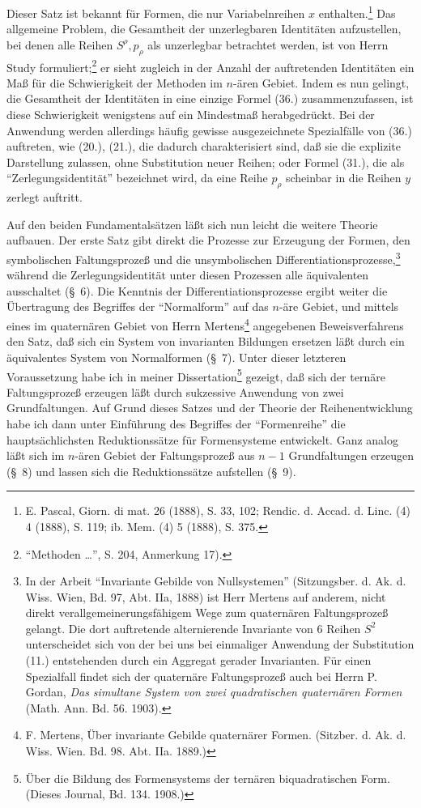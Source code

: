 \documentclass[11pt]{article}
\begin{document}
Dieser Satz ist bekannt für Formen, die nur Variabelnreihen $x$ enthalten.\footnote{E. Pascal, Giorn. di mat. 26 (1888), S. 33, 102; Rendic. d. Accad. d. Linc. (4) 4 (1888), S. 119; ib. Mem. (4) 5 (1888), S. 375.} Das allgemeine Problem, die Gesamtheit der unzerlegbaren Identitäten aufzustellen, bei denen alle Reihen $S^\rho,p_\rho$ als unzerlegbar betrachtet werden, ist von Herrn Study formuliert;\footnote{``Methoden \dots'', S. 204, Anmerkung 17).} er sieht zugleich in der Anzahl der auftretenden Identitäten ein Maß für die Schwierigkeit der Methoden im $n$-ären Gebiet. Indem es nun gelingt, die Gesamtheit der Identitäten in eine einzige Formel (36.) zusammenzufassen, ist diese Schwierigkeit wenigstens auf ein Mindestmaß herabgedrückt. Bei der Anwendung werden allerdings häufig gewisse ausgezeichnete Spezialfälle von (36.) auftreten, wie (20.), (21.), die dadurch charakterisiert sind, daß sie die explizite Darstellung zulassen, ohne Substitution neuer Reihen; oder Formel (31.), die als ``Zerlegungsidentität'' bezeichnet wird, da eine Reihe $p_\rho$ scheinbar in die Reihen $y$ zerlegt auftritt.

Auf den beiden Fundamentalsätzen läßt sich nun leicht die weitere Theorie aufbauen. Der erste Satz gibt direkt die Prozesse zur Erzeugung der Formen, den symbolischen Faltungsprozeß und die unsymbolischen Differentiationsprozesse,\footnote{In der Arbeit ``Invariante Gebilde von Nullsystemen'' (Sitzungsber. d. Ak. d. Wiss. Wien, Bd. 97, Abt. IIa, 1888) ist Herr Mertens auf anderem, nicht direkt verallgemeinerungsfähigem Wege zum quaternären Faltungsprozeß gelangt. Die dort auftretende alternierende Invariante von 6 Reihen $S^2$ unterscheidet sich von der bei uns bei einmaliger Anwendung der Substitution (11.) entstehenden durch ein Aggregat gerader Invarianten. Für einen Spezialfall findet sich der quaternäre Faltungsprozeß auch bei Herrn P. Gordan, \emph{Das simultane System von zwei quadratischen quaternären Formen} (Math. Ann. Bd. 56. 1903).} während die Zerlegungsidentität unter diesen Prozessen alle äquivalenten ausschaltet (\S\ 6). Die Kenntnis der Differentiationsprozesse ergibt weiter die Übertragung des Begriffes der ``Normalform'' auf das $n$-äre Gebiet, und mittels eines im quaternären Gebiet von Herrn Mertens\footnote{F. Mertens, Über invariante Gebilde quaternärer Formen. (Sitzber. d. Ak. d. Wiss. Wien. Bd. 98. Abt. IIa. 1889.)} angegebenen Beweisverfahrens den Satz, daß sich ein System von invarianten Bildungen ersetzen läßt durch ein äquivalentes System von Normalformen (\S\ 7). Unter dieser letzteren Voraussetzung habe ich in meiner Dissertation\footnote{Über die Bildung des Formensystems der ternären biquadratischen Form. (Dieses Journal, Bd. 134. 1908.)} gezeigt, daß sich der ternäre Faltungsprozeß erzeugen läßt durch sukzessive Anwendung von zwei Grundfaltungen. Auf Grund dieses Satzes und der Theorie der Reihenentwicklung habe ich dann unter Einführung des Begriffes der ``Formenreihe'' die hauptsächlichsten Reduktionssätze für Formensysteme entwickelt. Ganz analog läßt sich im $n$-ären Gebiet der Faltungsprozeß aus $n-1$ Grundfaltungen erzeugen (\S\ 8) und lassen sich die Reduktionssätze aufstellen (\S\ 9).
\end{document}
